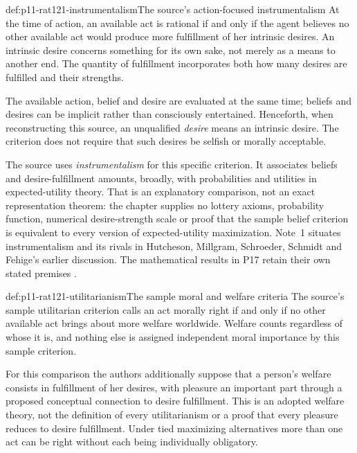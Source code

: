 \begin{hbdefinition}{def:p11-rat121-instrumentalism}{The source's action-focused instrumentalism}
At the time of action, an available act is rational if and only if
the agent believes no other available act would produce more
fulfillment of her intrinsic desires. An intrinsic desire concerns
something for its own sake, not merely as a means to another end.
The quantity of fulfillment incorporates both how many desires are
fulfilled and their strengths.

The available action, belief and desire are evaluated at the same
time; beliefs and desires can be implicit rather than consciously
entertained. Henceforth, when reconstructing this source, an
unqualified \emph{desire} means an intrinsic desire. The criterion
does not require that such desires be selfish or morally acceptable.
\end{hbdefinition}

The source uses \emph{instrumentalism} for this specific criterion.
It associates beliefs and desire-fulfillment amounts, broadly, with
probabilities and utilities in expected-utility theory. That is an
explanatory comparison, not an exact representation theorem: the
chapter supplies no lottery axioms, probability function, numerical
desire-strength scale or proof that the sample belief criterion is
equivalent to every version of expected-utility maximization.
Note~1 situates instrumentalism and its rivals in Hutcheson,
Millgram, Schroeder, Schmidt and Fehige's earlier discussion.
The mathematical results in P17 retain their own stated premises
\parencite[p.~682 and n.~1]{FehigeWessels2021Morality}.

\begin{hbdefinition}{def:p11-rat121-utilitarianism}{The sample moral and welfare criteria}
The source's sample utilitarian criterion calls an act morally right
if and only if no other available act brings about more welfare
worldwide. Welfare counts regardless of whose it is, and nothing
else is assigned independent moral importance by this sample criterion.

For this comparison the authors additionally suppose that a person's
welfare consists in fulfillment of her desires, with pleasure an
important part through a proposed conceptual connection to desire
fulfillment. This is an adopted welfare theory, not the definition
of every utilitarianism or a proof that every pleasure reduces to
desire fulfillment. Under tied maximizing alternatives more than
one act can be right without each being individually obligatory.
\end{hbdefinition}

